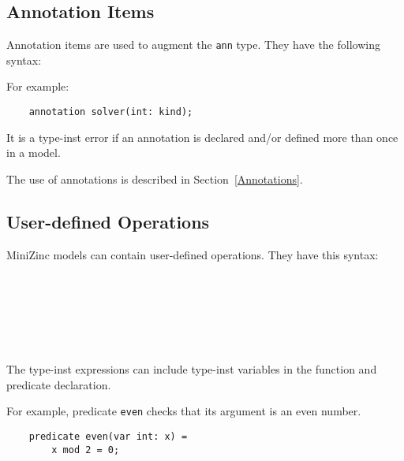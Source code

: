\documentclass[10pt]{scrartcl}
\begin{document}
\subsection{Annotation Items}
     \label{Annotation Items}
Annotation items are used to augment the \texttt{ann} type.  They have the
following syntax:
\begin{productions}
    \RuleAnnotationItem
\end{productions}
For example:
\begin{verbatim}
    annotation solver(int: kind);
\end{verbatim}

It is a type-inst error if an annotation is declared and/or defined more
than once in a model.

The use of annotations is described in Section~\ref{Annotations}.

\subsection{User-defined Operations}
     \label{preds and fns}

MiniZinc models can contain user-defined operations.  They have this syntax:
\begin{productions}
    \RulePredicateItem \\
    \RuleTestItem \\
    \RuleFunctionItem \\
    \RuleOperationItemTail \\
    \RuleParams \\
\end{productions}

The type-inst expressions can include type-inst variables in
the function and predicate declaration.

For example, predicate \texttt{even} checks that its argument is an even
number.
\begin{verbatim}
    predicate even(var int: x) =
        x mod 2 = 0;
\end{verbatim}
\end{document}
